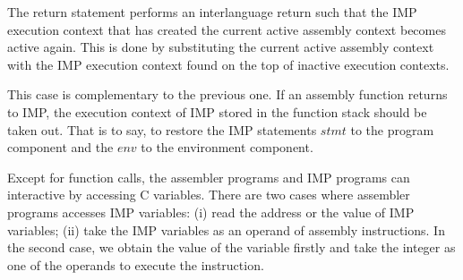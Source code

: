 \documentclass[letterpaper, 10 pt, conference]{IEEEtran}
\begin{document}
\par The return statement performs an interlanguage
return such that the IMP execution context that has created the current active
assembly context becomes active again. This is done by substituting the current active
assembly context with the IMP execution context found on the top of inactive execution
contexts.
\par This case is complementary to the previous one. If an assembly function returns to IMP, the execution context of IMP stored in the function stack should be taken out. That is to say, to restore the IMP statements $stmt$ to the program component and the $env$ to the environment component.
\par Except for function calls, the assembler programs and IMP programs can interactive by accessing C variables. There are two cases where assembler programs accesses IMP variables: (i) read the address or the value of IMP variables; (ii) take the IMP variables as an operand of assembly instructions. In the second case, we obtain the value of the variable firstly and take the integer as one of the operands to execute the instruction.\\ \\
\end{document}

